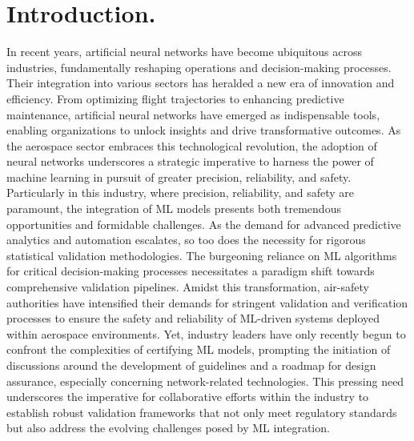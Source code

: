 \chapter{Introduction.}
%
\indent In recent years, artificial neural networks\cite{Marsland2015Machine} have become ubiquitous across industries, fundamentally reshaping operations and decision-making processes. Their integration into various sectors has heralded a new era of innovation and efficiency. From optimizing flight trajectories\cite{xu2023machine} to enhancing predictive maintenance\cite{shukla2020opportunities,adhikari2018machine,korvesis2017machine}, artificial neural networks have emerged as indispensable tools, enabling organizations to unlock insights and drive transformative outcomes. As the aerospace sector embraces this technological revolution, the adoption of neural networks underscores a strategic imperative to harness the power of machine learning in pursuit of greater precision, reliability, and safety. Particularly in this industry, where precision, reliability, and safety are paramount, the integration of ML models presents both tremendous opportunities and formidable challenges. As the demand for advanced predictive analytics and automation escalates, so too does the necessity for rigorous statistical validation methodologies. The burgeoning reliance on ML algorithms for critical decision-making processes necessitates a paradigm shift towards comprehensive validation pipelines. Amidst this transformation, air-safety authorities have intensified their demands for stringent validation and verification processes to ensure the safety and reliability of ML-driven systems deployed within aerospace environments. Yet, industry leaders have only recently begun to confront the complexities of certifying ML models, prompting the initiation of discussions around the development of guidelines and a roadmap for design assurance, especially concerning network-related technologies. This pressing need underscores the imperative for collaborative efforts within the industry to establish robust validation frameworks that not only meet regulatory standards but also address the evolving challenges posed by ML integration.\\
%
\indent
%
